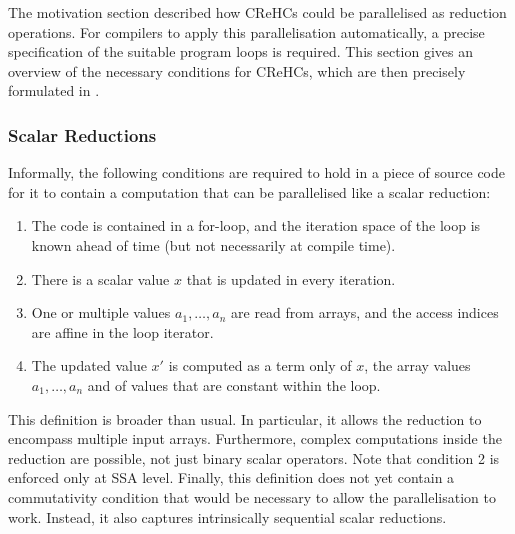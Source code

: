     The motivation section described how CReHCs could be parallelised as
    reduction operations.
    For compilers to apply this parallelisation automatically, a precise
    specification of the suitable program loops is required.
    This section gives an overview of the necessary conditions for CReHCs, which
    are then precisely formulated in .

\subsubsection{Scalar Reductions}
\label{section:scalarcond}

    Informally, the following conditions are required to hold in a piece of
    source code for it to contain a computation that can be parallelised like a
    scalar reduction:
    \begin{enumerate}
        \item The code is contained in a for-loop, and the iteration space of
              the loop is known ahead of time
              (but not necessarily at compile time).
        \item There is a scalar value $x$ that is updated in every iteration.
        \item One or multiple values $a_1,\dots,a_n$ are read from arrays, and
              the access indices are affine in the loop iterator.
        \item The updated value $x'$ is computed as a term only of $x$, the
              array values $a_1,\dots,a_n$ and of values that are constant
              within the loop.
    \end{enumerate}

    This definition is broader than usual.
    In particular, it allows the reduction to encompass multiple input arrays.
    Furthermore, complex computations inside the reduction are possible, not
    just binary scalar operators.
    Note that condition 2 is enforced only at SSA level.
    Finally, this definition does not yet contain a commutativity condition that
    would be necessary to allow the parallelisation to work.
    Instead, it also captures intrinsically sequential scalar reductions.

